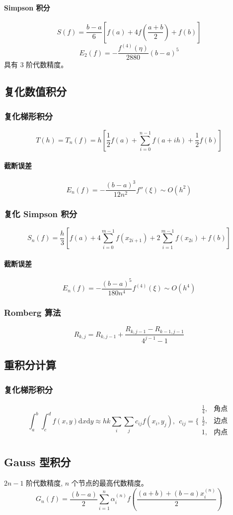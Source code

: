 \documentclass[a4paper,12pt]{article}
\begin{document}
\paragraph{Simpson 积分}
\[
S(f)=\frac{b-a}{6}[f(a)+4f(\frac{a+b}{2})+f(b)]
\]
\[
E_2(f)=-\frac{f^{(4)}(\eta)}{2880}(b-a)^5
\]
具有 $3$ 阶代数精度。
\subsection{复化数值积分}
\subsubsection{复化梯形积分}
\[
T(h)=T_n(f)=h\left[\frac{1}{2}f(a)+\sum_{i=0}^{n-1}f(a+ih)+\frac{1}{2}f(b)\right]
\]
\paragraph{截断误差}
\[
E_n(f)=-\frac{(b-a)^3}{12n^2}f''(\xi)\sim O(h^2)
\]
\subsubsection{复化 Simpson 积分}
\[
S_n(f)=\frac{h}{3}\left[f(a)+4\sum_{i=0}^{m-1}f(x_{2i+1})+2\sum_{i=1}^{m-1}f(x_{2i})+f(b)\right]
\]
\paragraph{截断误差}
\[
E_n(f)=-\frac{(b-a)^5}{180n^4}f^{(4)}(\xi)\sim O(h^4)
\]
\subsubsection{Romberg 算法}
\[
R_{k,j}=R_{k,j-1}+\frac{R_{k,j-1}-R_{k-1,j-1}}{4^{j-1}-1}
\]
\subsection{重积分计算}
\subsubsection{复化梯形积分}
$$\int_a^b\int_c^df(x,y)\mathrm{d}x\mathrm{d}y\approx hk\sum_i\sum_jc_{ij}f(x_i,y_j),\ \ c_{ij}=\Bigg\{
\begin{array}{ll}
\frac{1}{4},&\text{角点}\\
\frac{1}{2},&\text{边点}\\
1,&\text{内点}\\
\end{array}$$
\subsection{Gauss 型积分}
$2n-1$ 阶代数精度, $n$ 个节点的最高代数精度。
\[
G_n(f)=\frac{(b-a)}{2}\sum_{i=1}^{n}\alpha_i^{(n)}f\left(\frac{(a+b)+(b-a)x_i^{(n)}}{2}\right)
\]
\end{document}

